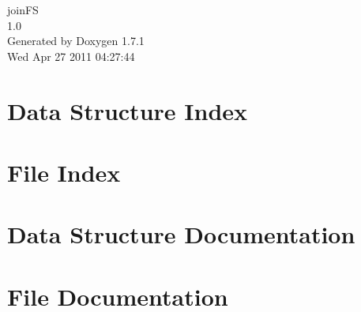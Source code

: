\documentclass[a4paper]{book}
\begin{document}
\hypersetup{pageanchor=false}
\begin{titlepage}
\vspace*{7cm}
\begin{center}
{\Large joinFS \\[1ex]\large 1.0 }\\
\vspace*{1cm}
{\large Generated by Doxygen 1.7.1}\\
\vspace*{0.5cm}
{\small Wed Apr 27 2011 04:27:44}\\
\end{center}
\end{titlepage}
\clearemptydoublepage
{}
\tableofcontents
\clearemptydoublepage
{}
\hypersetup{pageanchor=true}
\chapter{Data Structure Index}

\chapter{File Index}

\chapter{Data Structure Documentation}












\chapter{File Documentation}









































\printindex
\end{document}
